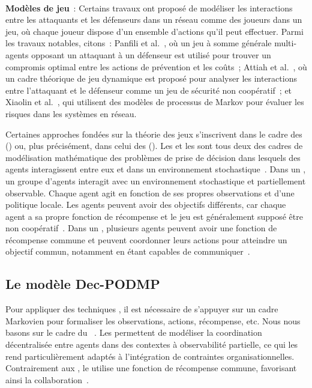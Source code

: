 \

\noindent
\textbf{Modèles de jeu}~: \quad Certains travaux ont proposé de modéliser les interactions entre les attaquants et les défenseurs dans un réseau comme des joueurs dans un jeu, où chaque joueur dispose d'un ensemble d'actions qu'il peut effectuer.
Parmi les travaux notables, citons~: Panfili et al.~\cite{MPanfili2018}, où un jeu à somme générale multi-agents opposant un attaquant à un défenseur est utilisé pour trouver un compromis optimal entre les actions de prévention et les coûts~; Attiah et al.~\cite{AAttiah2018}, où un cadre théorique de jeu dynamique est proposé pour analyser les interactions entre l'attaquant et le défenseur comme un jeu de sécurité non coopératif~; et Xiaolin et al.~\cite{CXiaolin2008}, qui utilisent des modèles de processus de Markov pour évaluer les risques dans les systèmes en réseau.

\noindent
Certaines approches fondées sur la théorie des jeux s'inscrivent dans le cadre des  () ou, plus précisément, dans celui des  (). Les  et les  sont tous deux des cadres de modélisation mathématique des problèmes de prise de décision dans lesquels des agents interagissent entre eux et dans un environnement stochastique~\cite{beynier2010}. Dans un , un groupe d'agents interagit avec un environnement stochastique et partiellement observable. Chaque agent agit en fonction de ses propres observations et d'une politique locale. Les agents peuvent avoir des objectifs différents, car chaque agent a sa propre fonction de récompense et le jeu est généralement supposé être non coopératif~\cite{terry2020pettingzoo}. Dans un , plusieurs agents peuvent avoir une fonction de récompense commune et peuvent coordonner leurs actions pour atteindre un objectif commun, notamment en étant capables de communiquer~\cite{bernstein2013}.



\subsection{Le modèle Dec-PODMP}\label{sec:dec-podmp}

Pour appliquer des techniques , il est nécessaire de s'appuyer sur un cadre Markovien pour formaliser les observations, actions, récompense, etc. Nous nous basons sur le cadre du ~\cite{Oliehoek2016}. Les  permettent de modéliser la coordination décentralisée entre agents dans des contextes à observabilité partielle, ce qui les rend particulièrement adaptés à l'intégration de contraintes organisationnelles. Contrairement aux , le  utilise une fonction de récompense commune, favorisant ainsi la collaboration~\cite{Beynier2013}.

